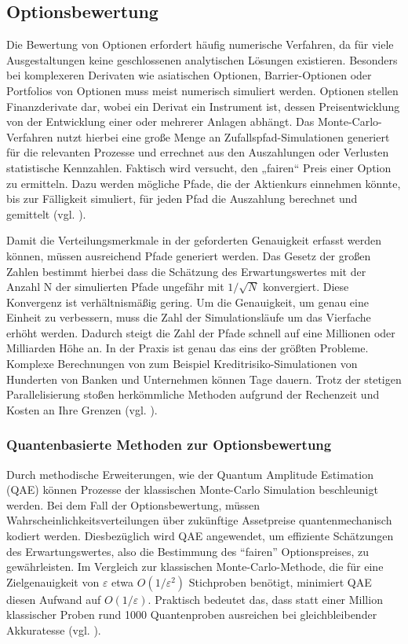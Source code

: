 \subsection{Optionsbewertung}
Die Bewertung von Optionen erfordert häufig numerische Verfahren, da für viele Ausgestaltungen keine geschlossenen analytischen Lösungen existieren. Besonders bei komplexeren Derivaten wie asiatischen Optionen, Barrier-Optionen oder Portfolios von Optionen muss meist numerisch simuliert werden. Optionen stellen Finanzderivate dar, wobei ein Derivat ein Instrument ist, dessen Preisentwicklung von der Entwicklung einer oder mehrerer Anlagen abhängt. Das Monte-Carlo-Verfahren nutzt hierbei eine große Menge an Zufallspfad-Simulationen generiert für die relevanten Prozesse und errechnet aus den Auszahlungen oder Verlusten statistische Kennzahlen. Faktisch wird versucht, den „fairen“ Preis einer Option zu ermitteln. Dazu werden mögliche Pfade, die der Aktienkurs einnehmen könnte, bis zur Fälligkeit simuliert, für jeden Pfad die Auszahlung berechnet und gemittelt (vgl. \cite{orus_quantum_2019}).
 
Damit die Verteilungsmerkmale in der geforderten Genauigkeit erfasst werden können, müssen ausreichend Pfade generiert werden. Das Gesetz der großen Zahlen bestimmt hierbei dass die Schätzung des Erwartungswertes mit der Anzahl N der simulierten Pfade ungefähr mit $1/\sqrt{N}$ konvergiert. Diese Konvergenz ist verhältnismäßig gering. Um die Genauigkeit, um genau eine Einheit zu verbessern, muss die Zahl der Simulationsläufe um das Vierfache erhöht werden. Dadurch steigt die Zahl der Pfade schnell auf eine Millionen oder Milliarden Höhe an.
In der Praxis ist genau das eins der größten Probleme. Komplexe Berechnungen von zum Beispiel Kreditrisiko-Simulationen von Hunderten von Banken und Unternehmen können Tage dauern. Trotz der stetigen Parallelisierung stoßen herkömmliche Methoden aufgrund der Rechenzeit und Kosten an Ihre Grenzen (vgl. \cite{orus_quantum_2019}).

\subsubsection*{Quantenbasierte Methoden zur Optionsbewertung}

Durch methodische Erweiterungen, wie der Quantum Amplitude Estimation (QAE) können Prozesse der klassischen Monte-Carlo Simulation beschleunigt werden. Bei dem Fall der Optionsbewertung, müssen Wahrscheinlichkeitsverteilungen über zukünftige Assetpreise quantenmechanisch kodiert werden. Diesbezüglich wird QAE angewendet, um effiziente Schätzungen des Erwartungswertes, also die Bestimmung des “fairen” Optionspreises, zu gewährleisten. Im Vergleich zur klassischen Monte-Carlo-Methode, die für eine Zielgenauigkeit von $\varepsilon$ etwa $O(1/\varepsilon^2)$ Stichproben benötigt, minimiert QAE diesen Aufwand auf $O(1/\varepsilon)$. Praktisch bedeutet das, dass statt einer Million klassischer Proben rund 1000 Quantenproben ausreichen bei gleichbleibender Akkuratesse (vgl. \cite{lomonaco_quantum_2002, montanaro_quantum_2015}).

